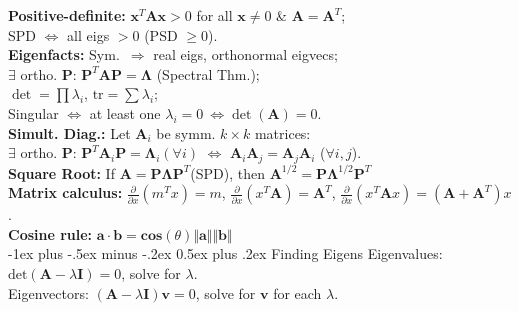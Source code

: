 \documentclass[10pt,landscape]{article}
\makeatletter
\renewcommand{\subsection}{\@startsection{subsection}{2}{0mm}%
                                {-1ex plus -.5ex minus -.2ex}%
                                {0.5ex plus .2ex}%
                                {\normalfont\small\bfseries}}
\makeatother
\begin{document}
\begin{multicols}{3}
\smallskip
\textbf{Positive-definite:} $\mathbf{x}^T \mathbf{A} \mathbf{x} > 0$ for all $\mathbf{x}\neq 0$ \& $\mathbf{A} = \mathbf{A}^T$;\\
\hspace*{1em} SPD $\Leftrightarrow$ all eigs $>0$ (PSD $\ge0$).\\
\smallskip
\textbf{Eigenfacts:} Sym.\ $\Rightarrow$ real eigs, orthonormal eigvecs; \\
\hspace*{1em} $\exists$ ortho. $\mathbf{P}$: $\mathbf{P}^T \mathbf{A} \mathbf{P} = \mathbf{\Lambda}$ (Spectral Thm.);\\
\hspace*{1em} $\det = \prod \lambda_i$, $\mathrm{tr} = \sum\lambda_i$;\\
\hspace*{1em} Singular $\Leftrightarrow$ at least one $\lambda_i = 0 \ \Leftrightarrow \det(\mathbf{A}) = 0$.\\
\smallskip
\textbf{Simult. Diag.:} Let $\mathbf{A}_i$ be symm. $k \times k$ matrices:\\
\hspace*{1em} $\exists$ ortho. $\mathbf{P}$: $\mathbf{P}^T \mathbf{A}_i \mathbf{P} = \mathbf{\Lambda}_i (\forall i)$ $\Leftrightarrow$ $\mathbf{A}_i \mathbf{A}_j=\mathbf{A}_j\mathbf{A}_i$ ($\forall i,j$).\\
\smallskip
\textbf{Square Root:} If $\mathbf A= \mathbf P\boldsymbol\Lambda\mathbf P^T$(SPD), then $\mathbf A^{1/2}= \mathbf P\boldsymbol\Lambda^{1/2}\mathbf P^T$\\
\smallskip
\textbf{Matrix calculus:} $\frac{\partial}{\partial x}(m^T x) = m$, 
$\frac{\partial}{\partial x}(x^T \mathbf{A}) = \mathbf{A}^T$, 
$\frac{\partial}{\partial x}(x^T \mathbf{A} x) = (\mathbf{A}+\mathbf{A}^T)x$.\\
\textbf{Cosine rule:} $\mathbf{a}\cdot\mathbf{b} = \mathbf{cos}(\theta)\Vert \mathbf{a}\Vert\Vert \mathbf{b}\Vert$\\
\medskip
\subsection{Finding Eigens}
Eigenvalues: $\mathrm{det}(\mathbf A-\lambda\mathbf I) = 0$, solve for $\lambda$.\\
Eigenvectors: $(\mathbf A-\lambda\mathbf I)\mathbf v=0$, solve for $ \mathbf v$ for each $\lambda$.\\
\medskip

\end{multicols}
\end{document}
